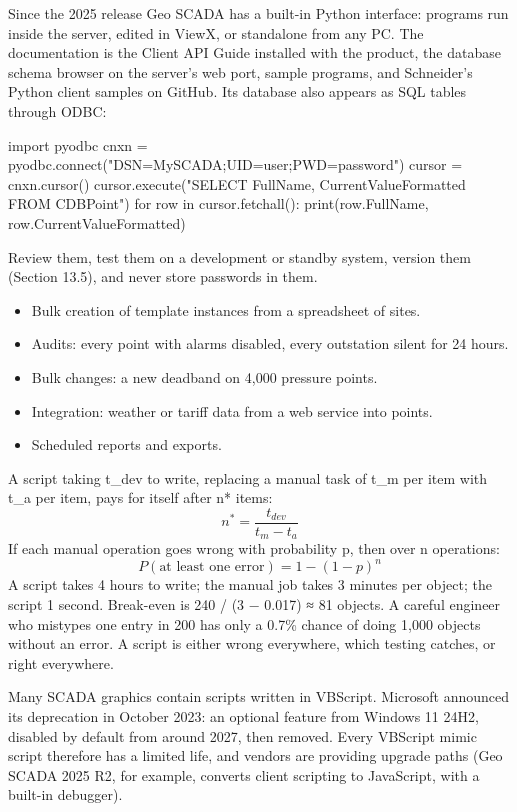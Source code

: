  Since the 2025 release Geo SCADA has a built-in Python interface: programs run inside the server, edited in ViewX, or standalone from any PC. The documentation is the Client API Guide installed with the product, the database schema browser on the server's web port, sample programs, and Schneider's Python client samples on GitHub. Its database also appears as SQL tables through ODBC:
\begin{code}
import pyodbc
cnxn = pyodbc.connect("DSN=MySCADA;UID=user;PWD=password")
cursor = cnxn.cursor()
cursor.execute("SELECT FullName, CurrentValueFormatted FROM CDBPoint")
for row in cursor.fetchall():
    print(row.FullName, row.CurrentValueFormatted)
\end{code}
 Review them, test them on a development or standby system, version them (Section 13.5), and never store passwords in them.

\begin{itemize}
\item Bulk creation of template instances from a spreadsheet of sites.
\item Audits: every point with alarms disabled, every outstation silent for 24 hours.
\item Bulk changes: a new deadband on 4,000 pressure points.
\item Integration: weather or tariff data from a web service into points.
\item Scheduled reports and exports.
\end{itemize}
 A script taking t\_dev to write, replacing a manual task of t\_m per item with t\_a per item, pays for itself after n* items:
\[ n^* = \frac{t_{dev}}{t_m - t_a} \]
 If each manual operation goes wrong with probability p, then over n operations:
\[ P(\text{at least one error}) = 1 - (1 - p)^n \]
 A script takes 4 hours to write; the manual job takes 3 minutes per object; the script 1 second. Break-even is 240 / (3 − 0.017) ≈ 81 objects. A careful engineer who mistypes one entry in 200 has only a 0.7\% chance of doing 1,000 objects without an error. A script is either wrong everywhere, which testing catches, or right everywhere.

Many SCADA graphics contain scripts written in VBScript. Microsoft announced its deprecation in October 2023: an optional feature from Windows 11 24H2, disabled by default from around 2027, then removed. Every VBScript mimic script therefore has a limited life, and vendors are providing upgrade paths (Geo SCADA 2025 R2, for example, converts client scripting to JavaScript, with a built-in debugger).


